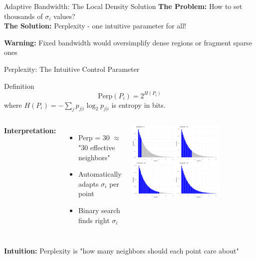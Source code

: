 \documentclass[aspectratio=169]{beamer}
\newcommand{\warning}[1]{\colorbox{red!10}{\textcolor{warningcolor}{\textbf{Warning:} #1}}}
\newcommand{\intuition}[1]{\colorbox{green!10}{\textcolor{intuitioncolor}{\textbf{Intuition:} #1}}}
\begin{document}
\begin{frame}{Adaptive Bandwidth: The Local Density Solution}
\vspace{0.3cm}
\textbf{The Problem:} How to set thousands of $\sigma_i$ values?\\
\textbf{The Solution:} Perplexity - one intuitive parameter for all!

\warning{Fixed bandwidth would oversimplify dense regions or fragment sparse ones}
\end{frame}

\begin{frame}{Perplexity: The Intuitive Control Parameter}
\begin{block}{Definition}
$$\text{Perp}(P_i) = 2^{H(P_i)}$$
where $H(P_i) = -\sum_j p_{j|i}\log_2 p_{j|i}$ is entropy in bits.
\end{block}

\begin{columns}
\textbf{Interpretation:}
\begin{itemize}
\item Perp = 30 $\approx$ "30 effective neighbors"
\item Automatically adapts $\sigma_i$ per point
\item Binary search finds right $\sigma_i$
\end{itemize}

\includegraphics[width=0.7\textwidth]{./Figures/perplexity_visual.png}
\end{columns}

\intuition{Perplexity is "how many neighbors should each point care about"}
\end{frame}
\end{document}
